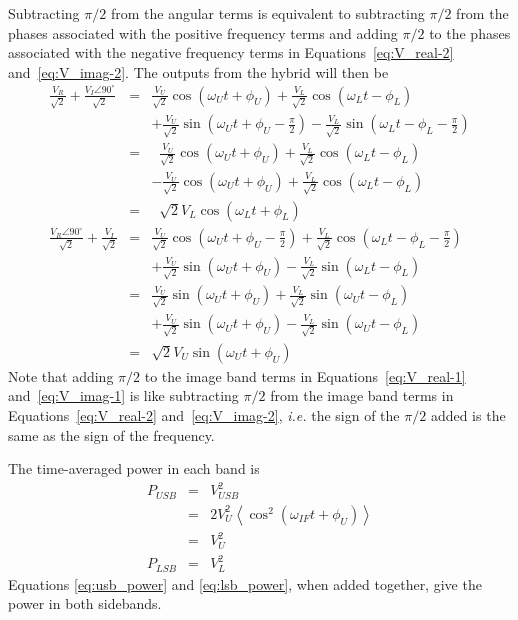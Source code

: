 \documentclass[letterpaper,11pt]{book}
\begin{document}
Subtracting $\pi/2$ from the angular terms is equivalent to 
subtracting $\pi/2$ from the phases associated with the positive 
frequency terms and adding $\pi/2$ to the phases associated with the 
negative frequency terms in Equations~\ref{eq:V_real-2} and~\ref{eq:V_imag-2}.
The outputs from the hybrid will then be
\begin{eqnarray}
\frac{V_R}{\sqrt{2}} + \frac{V_I \angle 90^{\circ}}{\sqrt{2}} \label{eq:sum_usb}
&=&
   \frac{V_{U}}{\sqrt{2}} \cos(\omega_{U} t + \phi_{U})
 + \frac{V_{L}}{\sqrt{2}} \cos(\omega_{L} t - \phi_{L}) \nonumber \\
& &
  + \frac{V_{U}}{\sqrt{2}} \sin(\omega_{U} t + \phi_{U} - \frac{\pi}{2})
  - \frac{V_{L}}{\sqrt{2}} \sin(\omega_{L} t - \phi_{L} - \frac{\pi}{2})
     \nonumber \\
&=&
\;\;  \frac{V_{U}}{\sqrt{2}} \cos(\omega_{U} t + \phi_{U})
    + \frac{V_{L}}{\sqrt{2}} \cos(\omega_{L} t - \phi_{L})
\nonumber \\
& & - \frac{V_{U}}{\sqrt{2}} \cos(\omega_{U} t + \phi_{U})
    + \frac{V_{L}}{\sqrt{2}} \cos(\omega_{L} t - \phi_{L})
\nonumber \\
&=& \;\;   \sqrt{2}V_{L} \cos(\omega_{L} t + \phi_{L}) \label{eq:nu_usb}\\
\frac{V_R \angle 90^{\circ}}{\sqrt{2}} + \frac{V_I}{\sqrt{2}} \label{eq:sum_lsb}
&=&
   \frac{V_{U}}{\sqrt{2}} \cos(\omega_{U} t + \phi_{U} - \frac{\pi}{2})
 + \frac{V_{L}}{\sqrt{2}} \cos(\omega_{L} t - \phi_{L} - \frac{\pi}{2}) \nonumber \\
& &
 + \frac{V_{U}}{\sqrt{2}} \sin(\omega_{U} t + \phi_{U})
 - \frac{V_{L}}{\sqrt{2}} \sin(\omega_{L} t - \phi_{L})
     \nonumber \\
&=&
  \frac{V_{U}}{\sqrt{2}} \sin(\omega_{U} t + \phi_{U})
 + \frac{V_{L}}{\sqrt{2}} \sin(\omega_{U} t - \phi_{L})
\nonumber \\
& &    + \frac{V_{U}}{\sqrt{2}} \sin(\omega_{U} t + \phi_{U})
       - \frac{V_{L}}{\sqrt{2}} \sin(\omega_{U} t - \phi_{L})
\nonumber \\
&=& \!    \sqrt{2}V_{U} \sin(\omega_{U} t + \phi_{U})
\end{eqnarray}
Note that adding $\pi/2$ to the image band terms in
Equations~\ref{eq:V_real-1} and~\ref{eq:V_imag-1} is like subtracting
$\pi/2$ from the image band terms in
Equations~\ref{eq:V_real-2} and~\ref{eq:V_imag-2},
{\itshape i.e.} the sign of the $\pi/2$ added is the same as the sign
of the frequency.

The time-averaged power in each band is
\begin{eqnarray}
P_{USB} &=& V^2_{USB} \nonumber \\
        &=& 2 V^2_{U}
\left \langle\cos^2(\omega_{IF} t + \phi_{U}) \right \rangle
\nonumber \\
        &=& V^2_{U} \label{eq:usb_power}\\
P_{LSB} &=& V^2_{L} \label{eq:lsb_power}
\end{eqnarray}
Equations \ref{eq:usb_power} and \ref{eq:lsb_power},
when added together, give the power in both sidebands.




\clearpage

\printindex
\end{document}
